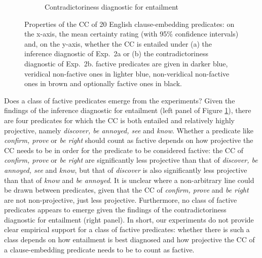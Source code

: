 \documentclass[11pt,fleqn]{article}
\newcommand{\6}{\mbox{$[\hspace*{-.6mm}[$}}
\newcommand{\9}{\mbox{$]\hspace*{-.6mm}]$}}
\begin{document}
{\begin{itemize}
\begin{figure}[h]
\begin{subfigure}{.5\textwidth}
\caption{Contradictoriness diagnostic for entailment}
\end{subfigure}

\caption{Properties of the CC of 20 English clause-embedding predicates: on the x-axis, the mean certainty rating (with 95\% confidence intervals) and, on the y-axis, whether the CC is entailed under (a) the inference diagnostic of Exp.~2a or (b) the contradictoriness diagnostic of Exp.~2b. factive predicates are given in darker blue, veridical non-factive ones in lighter blue, non-veridical non-factive ones in brown and optionally factive ones in black.}\label{f-summary-categorical}

\end{figure}

Does a class of factive predicates emerge from the experiments? Given the findings of the inference diagnostic for entailment (left panel of Figure \ref{f-summary-categorical}), there are four predicates for which the CC is both entailed and relatively highly projective, namely {\em discover, be annoyed, see} and {\em know}. Whether a predicate like {\em confirm, prove} or {\em be right} should count as factive depends on how projective the CC needs to be in order for the predicate to be considered factive: the CC of {\em confirm, prove} or {\em be right} are significantly less projective than that of {\em discover, be annoyed, see} and {\em know}, but that of {\em discover} is also significantly less projective than that of {\em know} and {\em be annoyed}. It is unclear where a non-arbitrary line could be drawn between predicates, given that the CC of {\em confirm, prove} and {\em be right} are not non-projective, just less projective. Furthermore, no class of factive predicates appears to emerge given the findings of the  contradictoriness diagnostic for entailment (right panel). In short, our experiments do not provide clear empirical support for a class of factive predicates: whether there is such a class depends on how entailment is best diagnosed and how projective the CC of a clause-embedding predicate needs to be to count as factive.


\end{itemize}}
\end{document}
